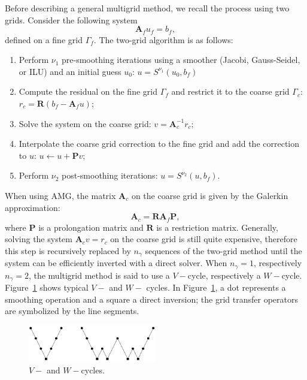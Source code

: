 \documentclass[preprint,10pt]{elsarticle}
\newcommand\bs{\boldsymbol}
\renewcommand{\(}{\left(}
\renewcommand{\)}{\right)}
\renewcommand{\[}{\left[}
\renewcommand{\]}{\right]}
\begin{document}
Before describing a general multigrid method, we recall the process using 
two grids. Consider the following system
\begin{equation}
  \bs{A}_f u_f = b_f,
\end{equation}
defined on a fine grid $\Gamma_f$. The two-grid algorithm is as follows:
\begin{enumerate}
  \item Perform $\nu_1$ pre-smoothing iterations using a smoother (Jacobi,
    Gauss-Seidel, or ILU) and an initial guess $u_0$: $u = S^{\nu_1}(u_0,b_f)$
  \item Compute the residual on the fine grid $\Gamma_f$ and restrict it to
    the coarse grid $\Gamma_c$: $r_c = \bs{R}(b_f-\bs{A}_f u)$;
  \item Solve the system on the coarse grid: $v=\bs{A}_c^{-1} r_c$;
  \item Interpolate the coarse grid correction to the fine grid and add the
    correction to $u$: $u \leftarrow u+\bs{P}v$;
  \item Perform $\nu_2$ post-smoothing iterations: $u = S^{\nu_2}(u,b_f)$.
\end{enumerate}
When using AMG, the matrix $\bs{A}_c$ on the coarse grid is given by the
Galerkin approximation:
\begin{equation}
  \bs{A}_c = \bs{R} \bs{A}_f \bs{P},
\end{equation}
where $\bs{P}$ is a prolongation matrix and $\bs{R}$ is a restriction matrix. 
Generally, solving the system $\bs{A}_c v = r_c$ on the coarse grid is still
quite expensive, therefore this step is recursively replaced by $n_{\gamma}$
sequences of the two-grid method until the system can be efficiently inverted 
with a direct solver.
When $n_\gamma = 1$, respectively $n_\gamma =
2$, the multigrid method is said to use a $V-$cycle, respectively a $W-$cycle. 
Figure~\ref {fig_v_w} shows typical $V-$ and $W-$ cycles. In Figure~\ref {fig_v_w}, a 
dot represents a smoothing operation and a square a
direct inversion; the grid transfer operators are symbolized by the line segments.
\begin{figure}[H]
  \centering
  \includegraphics[width=0.5\textwidth]{v_w_cycles}
  \caption{$V-$ and $W-$cycles.}
  \label{fig_v_w}
\end{figure}
\end{document}
